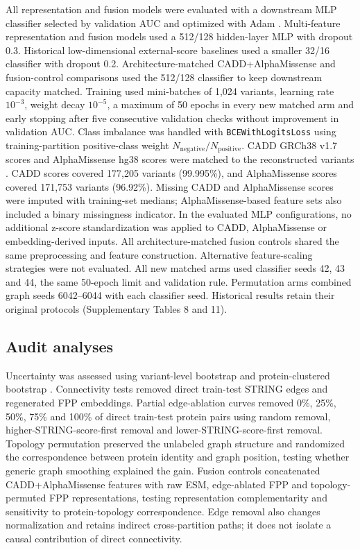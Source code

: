 \documentclass[conference]{IEEEtran}
\newcommand{\CADDAM}{CADD\allowbreak{}+\allowbreak{}AlphaMissense}
\begin{document}
All representation and fusion models were evaluated with a downstream MLP classifier selected by validation AUC and optimized with Adam \cite{Kingma2015Adam}. Multi-feature representation and fusion models used a 512/128 hidden-layer MLP with dropout 0.3. Historical low-dimensional external-score baselines used a smaller 32/16 classifier with dropout 0.2. Architecture-matched \CADDAM{} and fusion-control comparisons used the 512/128 classifier to keep downstream capacity matched. Training used mini-batches of 1,024 variants, learning rate $10^{-3}$, weight decay $10^{-5}$, a maximum of 50 epochs in every new matched arm and early stopping after five consecutive validation checks without improvement in validation AUC. Class imbalance was handled with \texttt{BCEWithLogitsLoss} using training-partition positive-class weight $N_{\mathrm{negative}}/N_{\mathrm{positive}}$. CADD GRCh38 v1.7 scores and AlphaMissense hg38 scores were matched to the reconstructed variants \cite{Kircher2014CADD,Schubach2024CADDv17,Cheng2023AlphaMissense}. CADD scores covered 177,205 variants (99.995\%), and AlphaMissense scores covered 171,753 variants (96.92\%). Missing CADD and AlphaMissense scores were imputed with training-set medians; AlphaMissense-based feature sets also included a binary missingness indicator. In the evaluated MLP configurations, no additional z-score standardization was applied to CADD, AlphaMissense or embedding-derived inputs. All architecture-matched fusion controls shared the same preprocessing and feature construction. Alternative feature-scaling strategies were not evaluated. All new matched arms used classifier seeds 42, 43 and 44, the same 50-epoch limit and validation rule. Permutation arms combined graph seeds 6042--6044 with each classifier seed. Historical results retain their original protocols (Supplementary Tables 8 and 11).

\subsection{Audit analyses}

Uncertainty was assessed using variant-level bootstrap and protein-clustered bootstrap \cite{Efron1993Bootstrap}. Connectivity tests removed direct train-test STRING edges and regenerated FPP embeddings. Partial edge-ablation curves removed 0\%, 25\%, 50\%, 75\% and 100\% of direct train-test protein pairs using random removal, higher-STRING-score-first removal and lower-STRING-score-first removal. Topology permutation preserved the unlabeled graph structure and randomized the correspondence between protein identity and graph position, testing whether generic graph smoothing explained the gain. Fusion controls concatenated \CADDAM{} features with raw ESM, edge-ablated FPP and topology-permuted FPP representations, testing representation complementarity and sensitivity to protein-topology correspondence. Edge removal also changes normalization and retains indirect cross-partition paths; it does not isolate a causal contribution of direct connectivity.
\end{document}
